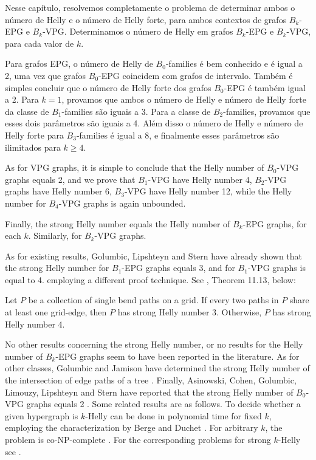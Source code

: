  Nesse capítulo, resolvemos completamente o problema de determinar ambos o número de Helly e o número de Helly forte, para ambos contextos de grafos $B_k$-EPG e $B_k$-VPG. Determinamos o número de Helly em grafos $B_k$-EPG e $B_k$-VPG, para cada valor de $k$.

Para grafos EPG, o número de Helly de $B_0$-families é bem conhecido e é igual a 2, uma vez que  grafos $B_0$-EPG coincidem com grafos de intervalo. Também é simples concluir que o número de Helly forte dos grafos $B_0$-EPG é também igual a 2. Para $k = 1$,   provamos que ambos o número de Helly e número de Helly forte da classe de $B_1$-families são iguais a 3. Para a classe de  $B_2$-families, provamos que esses dois parâmetros são iguais a 4. Além disso o número de Helly e número de Helly forte para $B_3$-families é igual a 8, e finalmente esses parâmetros são ilimitados para  $k \geq 4$. 

As for VPG graphs, it is simple to conclude that the Helly number of $B_0$-VPG graphs equals 2, and we prove that $B_1$-VPG have Helly number 4, $B_2$-VPG graphs have Helly number 6, $B_3$-VPG  have Helly number 12, while the Helly number for $B_4$-VPG graphs is again unbounded. 

Finally, the strong Helly number equals the Helly number of $B_k$-EPG graphs, for each $k$. Similarly, for $B_k$-VPG graphs. 

As for existing results, 
Golumbic, Lipshteyn  and Stern \cite{golumbic2009}  have already shown that the strong Helly number for $B_1$-EPG graphs equals 3, and for $B_1$-VPG graphs is equal to 4. employing a different proof technique. See  \cite{golumbic2019edge}, Theorem 11.13, below:
\begin{theorem}\label{thm:golumbic2019edge}{\cite{golumbic2019edge}}
Let $P$ be a collection of single bend paths on a grid. If every two paths in $P$ share at least one grid-edge, then $P$ has strong Helly number 3. Otherwise, $P$ has strong Helly number 4. 
\end{theorem}
No other results concerning the strong Helly number, or no results for the Helly number of $B_k$-EPG graphs seem to have been reported in the literature. As for other classes, Golumbic and Jamison have determined the strong Helly number of the intersection of edge paths of a tree \cite{golumbic1985}. Finally, Asinowski, Cohen, Golumbic, Limouzy, Lipshteyn and Stern have reported that the strong Helly number of $B_0$-VPG graphs equals 2 \cite{asinowski2011string}.  
Some related results are as follows. To decide  whether a given hypergraph is $k$-Helly can be done in polynomial time for fixed $k$, employing the characterization by Berge and Duchet \cite{bergeDuchet1975}. For arbitrary $k$, the problem is co-NP-complete \cite{dourado2009}. For the corresponding problems for strong $k$-Helly see \cite{dourado2008strong,dourado2009}.

